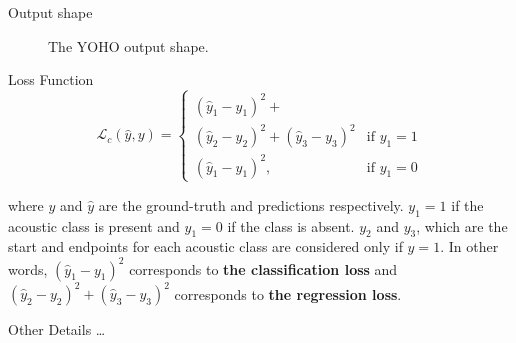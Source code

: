 \begin{frame}{Output shape}
\begin{figure}
			\caption{The YOHO output shape.}
			\label{fig:YOHOoutput}
		\end{figure}
		
	\end{frame}
	

	\begin{frame}{Loss Function}
		\begin{equation*}
			\mathcal{L}_{c}(\hat{y},y) = \begin{cases}
			(\hat{y}_1-y_1)^2+\\(\hat{y}_2-y_2)^2+(\hat{y}_3-y_3)^2 &\text{if $y_{1} = 1$}\\
			(\hat{y}_1-y_1)^2, &\text{if $y_1 = 0$}
			\end{cases}
		\end{equation*}
		
		where $y$ and $\hat{y}$ are the ground-truth and predictions respectively. $y_1 = 1$ if the acoustic class is present and $y_1 = 0$ if the class is absent. $y_2$ and $y_3$, which are the start and endpoints for each acoustic class are considered only if $y = 1$.
		In other words, $(\hat{y}_1-y_1)^2$ corresponds to \textbf{the classification loss} and $(\hat{y}_2-y_2)^2+(\hat{y}_3-y_3)^2$ corresponds to \textbf{the regression loss}.
		\note{
			\dots
		}
	\end{frame}
	
	\begin{frame}{Other Details}
		\dots
		
		\note{
			\dots
		}
	\end{frame}

